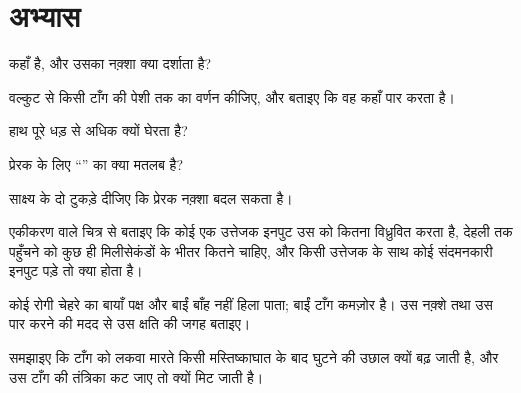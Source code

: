 \section{अभ्यास}

\begin{exercise}[$\star$]\label{exo:g12:brain-and-movement:1}
 कहाँ है, और उसका नक़्शा क्या दर्शाता है?
\end{exercise}

\begin{exercise}[$\star$]\label{exo:g12:brain-and-movement:2}
वल्कुट से किसी टाँग की पेशी तक  का वर्णन कीजिए, और बताइए कि वह
कहाँ पार करता है।
\end{exercise}

\begin{exercise}[$\star$]\label{exo:g12:brain-and-movement:3}
हाथ पूरे धड़ से अधिक  क्यों घेरता है?
\end{exercise}

\begin{exercise}[$\star$]\label{exo:g12:brain-and-movement:4}
प्रेरक  के लिए ``'' का क्या मतलब है?
\end{exercise}

\begin{exercise}[$\star$]\label{exo:g12:brain-and-movement:5}
साक्ष्य के दो टुकड़े दीजिए कि प्रेरक नक़्शा बदल सकता है।
\end{exercise}

\begin{exercise}[$\star\star$]\label{exo:g12:brain-and-movement:6}
एकीकरण वाले चित्र से बताइए कि कोई एक उत्तेजक इनपुट उस  को कितना
विध्रुवित करता है, देहली तक पहुँचने को कुछ ही मिलीसेकंडों के भीतर कितने
चाहिए, और किसी उत्तेजक के साथ कोई संदमनकारी इनपुट पड़े तो क्या होता है।
\end{exercise}

\begin{exercise}[$\star\star$]\label{exo:g12:brain-and-movement:7}
कोई रोगी चेहरे का बायाँ पक्ष और बाईं बाँह नहीं हिला पाता; बाईं टाँग कमज़ोर
है। उस नक़्शे तथा उस पार करने की मदद से उस क्षति की जगह बताइए।
\end{exercise}

\begin{exercise}[$\star\star$]\label{exo:g12:brain-and-movement:8}
समझाइए कि टाँग को लकवा मारते किसी मस्तिष्काघात के बाद घुटने की उछाल क्यों
बढ़ जाती है, और उस टाँग की तंत्रिका कट जाए तो क्यों मिट जाती है।
\end{exercise}

